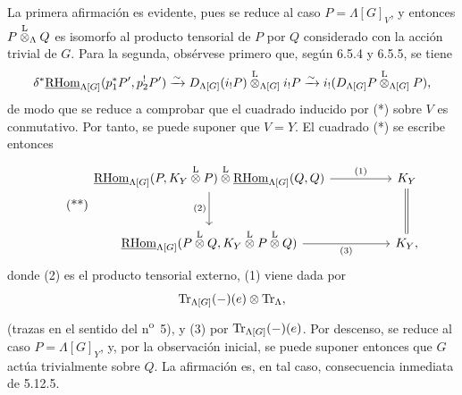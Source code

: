 La primera afirmación es evidente, pues se reduce al caso $P=\Lambda[G]_V$, y entonces $P\overset{\mathrm L}{\otimes}_{\Lambda}Q$ es isomorfo al producto tensorial de $P$ por $Q$ considerado con la acción trivial de $G$. Para la segunda, obsérvese primero que, según 6.5.4 y 6.5.5, se tiene
\[
\delta^*\underline{\mathrm{RHom}}_{\Lambda[G]}(p_1^*P',p_2^!P')
\xrightarrow{\sim}
D_{\Lambda[G]}(i_!P)\overset{\mathrm L}{\otimes}_{\Lambda[G]} i_!P
\xrightarrow{\sim}
i_!(D_{\Lambda[G]}P\overset{\mathrm L}{\otimes}_{\Lambda[G]}P),
\]
de modo que se reduce a comprobar que el cuadrado inducido por (*) sobre $V$ es conmutativo. Por tanto, se puede suponer que $V=Y$. El cuadrado (*) se escribe entonces
\begin{equation}
\tag{**}
\begin{tikzcd}[column sep=huge,row sep=large]
\uRHom_{\Lambda[G]}(P,K_Y\lten P)\lten\uRHom_{\Lambda[G]}(Q,Q)
  \arrow[r,"(1)"] \arrow[d,"(2)"']
& K_Y \arrow[d,equal]\\
\uRHom_{\Lambda[G]}(P\lten Q,K_Y\lten P\lten Q) \arrow[r,"(3)"']
& K_Y ,
\end{tikzcd}
\end{equation}
donde (2) es el producto tensorial externo, (1) viene dada por
\[
\operatorname{Tr}_{\Lambda[G]}(-)(e)\otimes\operatorname{Tr}_{\Lambda},
\]
(trazas en el sentido del n\textsuperscript{o}~5), y (3) por $\operatorname{Tr}_{\Lambda[G]}(-)(e)$. Por descenso, se reduce al caso $P=\Lambda[G]_Y$, y, por la observación inicial, se puede suponer entonces que $G$ actúa trivialmente sobre $Q$. La afirmación es, en tal caso, consecuencia inmediata de 5.12.5.
